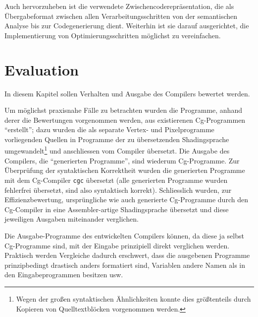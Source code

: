 \documentclass[twoside,a4paper,fleqn,12pt]{book}
\begin{document}
Auch hervorzuheben ist die verwendete Zwischencoderepräsentation, die als Übergabeformat zwischen allen Verarbeitungsschritten von der
semantischen Analyse bis zur Codegenerierung dient. Weiterhin ist sie darauf ausgerichtet, die Implementierung von Optimierungsschritten
möglichst zu vereinfachen.

\chapter{Evaluation}

\newcommand\prglisting[3]{\refstepcounter{program}\label{#1}#3\vspace{-1.5em}\begin{center}{\small Programm \arabic{program}: #2}\end{center}}


In diesem Kapitel sollen Verhalten und Ausgabe des Compilers bewertet werden.

Um möglichst praxisnahe Fälle zu betrachten wurden die Programme, anhand derer die Bewertungen vorgenommen werden,
aus existierenen Cg-Programmen "`erstellt"'; dazu wurden die als separate Vertex- und Pixelprogramme vorliegenden
Quellen in Programme der zu übersetzenden Shadingsprache umgewandelt\footnote{Wegen der großen syntaktischen Ähnlichkeiten
konnte dies größtenteils durch Kopieren von Quelltextblöcken vorgenommen werden.} und anschliessen vom Compiler übersetzt.
Die Ausgabe des Compilers, die "`generierten Programme"', sind wiederum Cg-Programme. Zur Überprüfung der syntaktischen Korrektheit wurden die
generierten Programme mit dem Cg-Compiler \verb+cgc+ übersetzt (alle generierten Programme wurden fehlerfrei übersetzt,
sind also syntaktisch korrekt). Schliesslich wurden, zur Effizienzbewertung, ursprüngliche
wie auch generierte Cg-Programme durch den Cg-Compiler in eine Assembler-artige Shadingsprache übersetzt und diese jeweiligen Ausgaben miteinander verglichen.

Die Ausgabe-Programme des entwickelten Compilers können, da diese ja selbst Cg-Programme sind, mit der Eingabe prinzipiell direkt verglichen
werden. Praktisch werden Vergleiche dadurch erschwert, dass die ausgebenen Programme prinzipbedingt drastisch anders formatiert sind, Variablen andere Namen als in den Eingabeprogrammen besitzen usw.
\end{document}
